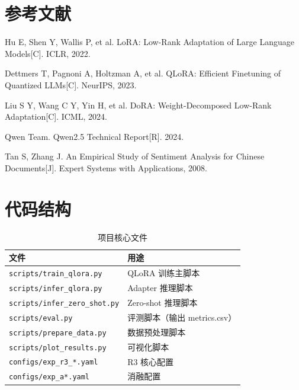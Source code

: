 \documentclass[12pt,a4paper]{article}
\begin{document}
\section*{参考文献}
\begin{enumerate}[label={[\arabic*]},leftmargin=2em]
  \item Hu E, Shen Y, Wallis P, et al. LoRA: Low-Rank Adaptation of Large Language Models[C]. ICLR, 2022.
  \item Dettmers T, Pagnoni A, Holtzman A, et al. QLoRA: Efficient Finetuning of Quantized LLMs[C]. NeurIPS, 2023.
  \item Liu S Y, Wang C Y, Yin H, et al. DoRA: Weight-Decomposed Low-Rank Adaptation[C]. ICML, 2024.
  \item Qwen Team. Qwen2.5 Technical Report[R]. 2024.
  \item Tan S, Zhang J. An Empirical Study of Sentiment Analysis for Chinese Documents[J]. Expert Systems with Applications, 2008.
\end{enumerate}

\newpage
\appendix
\section{代码结构}

\begin{table}[H]
\centering
\caption{项目核心文件}
\begin{tabular}{ll}
\toprule
\textbf{文件} & \textbf{用途} \\
\midrule
\texttt{scripts/train\_qlora.py} & QLoRA 训练主脚本 \\
\texttt{scripts/infer\_qlora.py} & Adapter 推理脚本 \\
\texttt{scripts/infer\_zero\_shot.py} & Zero-shot 推理脚本 \\
\texttt{scripts/eval.py} & 评测脚本（输出 metrics.csv） \\
\texttt{scripts/prepare\_data.py} & 数据预处理脚本 \\
\texttt{scripts/plot\_results.py} & 可视化脚本 \\
\texttt{configs/exp\_r3\_*.yaml} & R3 核心配置 \\
\texttt{configs/exp\_a*.yaml} & 消融配置 \\
\bottomrule
\end{tabular}
\end{table}
\end{document}
